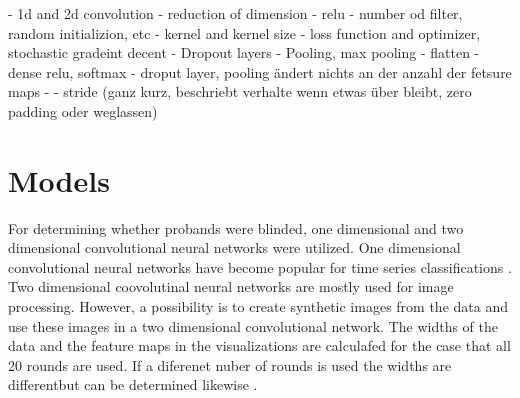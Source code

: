 - 1d and 2d convolution
- reduction of dimension
- relu 
- number od filter, random initializion, etc
- kernel and kernel size
- loss function and optimizer, stochastic gradeint decent
- Dropout layers
- Pooling, max pooling 
- flatten
- dense relu, softmax
- droput layer, pooling ändert nichts an der anzahl der fetsure maps
- 
- stride (ganz kurz, beschriebt verhalte wenn etwas über bleibt, zero padding oder weglassen)

\chapter{Models}
For determining whether probands were blinded, one dimensional and two dimensional convolutional neural networks were utilized. One dimensional convolutional neural networks have become popular for time series classifications . Two dimensional coovolutinal neural networks are mostly used for image processing. However, a possibility is to create synthetic images from the data and use these images in a two dimensional convolutional network. The widths of the data and the feature maps in the visualizations are calculafed for the case that all 20 rounds are used. If a diferenet nuber of rounds is used the widths are differentbut can be determined likewise .

